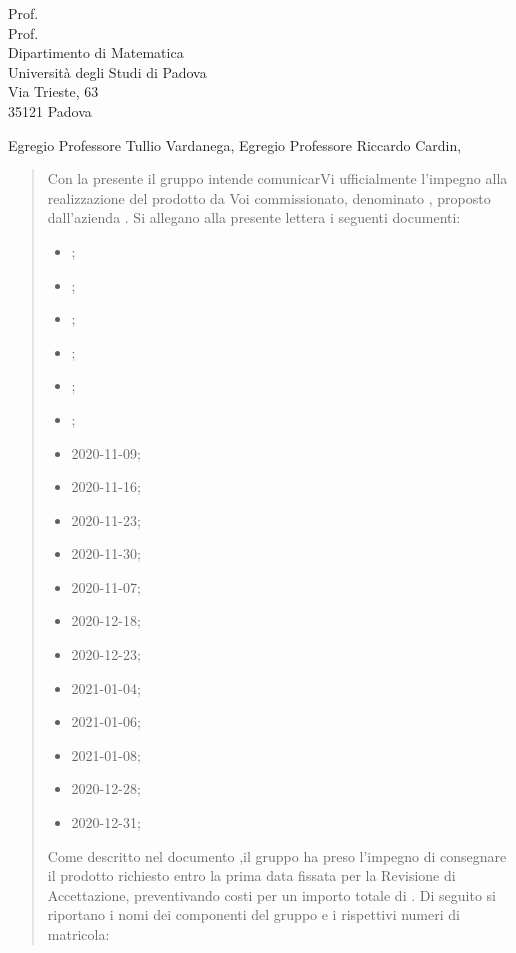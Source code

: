 \documentclass[a4paper,12pt]{letteracdp}
\date{11 gennaio 2021}
\begin{document}
\begin{letter}{
	Prof. \Tullio{} \\
	Prof. \Riccardo{} \\
	Dipartimento di Matematica \\
	Università degli Studi di Padova \\
	Via Trieste, 63 \\
	35121 Padova}
	
\opening{Egregio Professore Tullio Vardanega, \newline
Egregio Professore Riccardo Cardin,}

\begin{quotation}
	\noindent 
	Con la presente il gruppo \gruppo{} intende comunicarVi ufficialmente l'impegno alla realizzazione del prodotto da Voi commissionato, denominato \progetto{}, proposto dall’azienda \proponente.\newline
	Si allegano alla presente lettera i seguenti documenti:
	\begin{itemize}
		\item \docSdF{}\versSdF;
		\item \docAdR{}\versAdR;
		\item \docG{}\versGlo;
		\item \docNdP{}\versNdP;
		\item \docPdP{}\versPdP;
		\item \docPdQ{}\versPdQ;
		\item \docVI{}2020-11-09;
		\item \docVI{}2020-11-16;
		\item \docVI{}2020-11-23;
		\item \docVI{}2020-11-30;
		\item \docVI{}2020-11-07;
		\item \docVI{}2020-12-18;
		\item \docVI{}2020-12-23;
		\item \docVI{}2021-01-04;
		\item \docVI{}2021-01-06;
		\item \docVI{}2021-01-08;
		\item \docVE{}2020-12-28;
		\item \docVE{}2020-12-31;
		
	\end{itemize}
Come descritto nel documento \docPdP{}\versPdP{} ,il gruppo \gruppo{} ha preso l'impegno di consegnare il prodotto richiesto entro la prima data fissata per la Revisione di Accettazione, preventivando costi per un importo totale di \textbf{}. \newline
Di seguito si riportano i nomi dei componenti del gruppo e i rispettivi numeri di matricola:
	

\end{quotation}
\end{letter}
\end{document}

